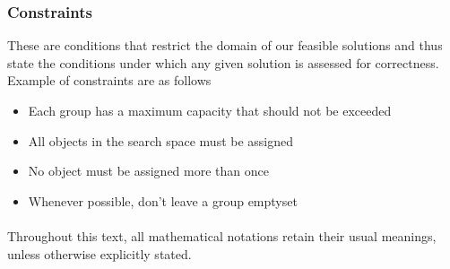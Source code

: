 \documentclass{article}
\begin{document}
            \subsubsection{Constraints}
                These are conditions that restrict the domain of our feasible solutions and thus state the conditions under which any given solution is assessed for correctness. Example of constraints are as follows
                \begin{itemize}
                    \item Each group has a maximum capacity that should not be exceeded
                    \item All objects in the search space must be assigned
                    \item No object must be assigned more than once
                    \item Whenever possible, don't leave a group emptyset
                \end{itemize}
            \paragraph{}
                Throughout this text, all mathematical notations retain their usual meanings, unless otherwise explicitly stated.
\end{document}

